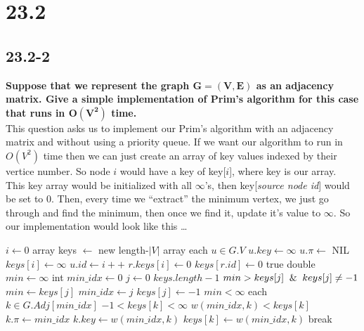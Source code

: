 \documentclass[11pt]{article}
\begin{document}
 \section*{23.2}
 \subsection*{23.2-2}
 \textbf{Suppose that we represent the graph \(\mathbf{G = (V,E)}\) as an adjacency matrix. Give a 
 simple implementation of Prim’s algorithm for this case that runs in \(\mathbf{O(V^2)}\) time.} \\ 

 This question asks us to implement our Prim's algorithm with an adjacency matrix and without using 
 a priority queue.  If we want our algorithm to run in \(O(V^2)\) time then we can just create an 
 array of key values indexed by their vertice number.  So node \(i\) would have a key of key[\(i\)], 
 where key is our array. \\ 

 This key array would be initialized with all \(\infty\)'s, then key[\textit{source node id}] would 
 be set to 0.  Then, every time we ``extract'' the minimum vertex, we just go through and find the 
 minimum, then once we find it, update it's value to \(\infty\).  So our implementation would look 
 like this \dots

 \singlespacing
 \begin{codebox}
   \li \(i \gets 0\)
   \li array keys \(\gets\) new length-\(|V|\) array
   \li \For each \(u \in G.V\)
       \li \Do \(u.key \gets \infty\)
       \li \(u.\pi \gets\) NIL
       \li \(keys[i] \gets \infty\) 
       \li \(u.id \gets i++\)
   \End
   \li \(r.keys[i] \gets 0\)
   \li \(keys[r.id] \gets 0\)
   \li \While true 
   \li \Do 
       double \(min \gets \infty\)
       \li int \(min\_idx \gets 0\)
       \li \For \(j \gets 0\) \To \(keys.length-1\)
       \li \Do 
           \If \(min > keys[j] \And keys[j] \not= -1\) 
           \li \Then 
               \(min \gets keys[j]\)
               \li \(min\_idx \gets j\)
               \li \(keys[j] \gets -1\)
           \End 
       \End
       \li \If \(min < \infty\) 
       \li \Then 
           \For each \(k \in G.Adj[min\_idx]\) 
           \li \Do 
               \If \(-1 < keys[k] < \infty\) \And \(w(min\_idx,k) < keys[k]\)
               \li \Then 
                   \(k.\pi \gets min\_idx\)
                   \li\(k.key \gets w(min\_idx,k)\)
                   \li \(keys[k] \gets w(min\_idx,k)\)
               \End 
           \End 
           \li \Else break 
       \End

       
 \end{codebox}
\end{document}
